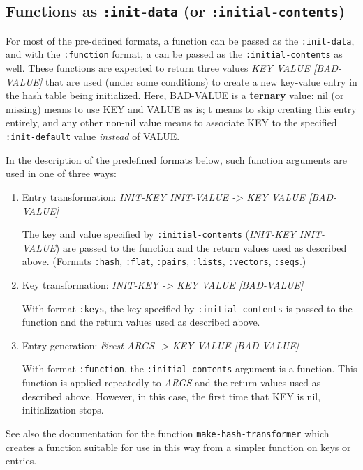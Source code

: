\documentclass[11pt]{article}
\begin{document}
\subsection{Functions as \texttt{:init-data} (or \texttt{:initial-contents})}
\label{sec-4-1}


   For most of the pre-defined formats, a function can be
   passed as the \texttt{:init-data}, and with the \texttt{:function} format,
   a can be passed as the \texttt{:initial-contents} as well.
   These functions are expected to return three values
       \emph{KEY VALUE [BAD-VALUE]}
   that are used (under some conditions) to create a new key-value
   entry in the hash table being initialized.  Here, BAD-VALUE
   is a \textbf{ternary} value: nil (or missing) means to use KEY and VALUE
   as is; t means to skip creating this entry entirely, and any
   other non-nil value means to associate KEY to the specified
   \texttt{:init-default} value \emph{instead} of VALUE.

   In the description of the predefined formats below, such function
   arguments are used in one of three ways:

\begin{enumerate}
\item Entry transformation: \emph{INIT-KEY INIT-VALUE -> KEY VALUE [BAD-VALUE]}
      
      The key and value specified by \texttt{:initial-contents} (\emph{INIT-KEY INIT-VALUE})
      are passed to the function and the return values used as described above.
      (Formats \texttt{:hash}, \texttt{:flat}, \texttt{:pairs}, \texttt{:lists}, \texttt{:vectors}, \texttt{:seqs}.)
\item Key transformation: \emph{INIT-KEY -> KEY VALUE [BAD-VALUE]}
      
      With format \texttt{:keys}, the key specified by \texttt{:initial-contents} is
      passed to the function and the return values used as described above.
\item Entry generation: \emph{&rest ARGS -> KEY VALUE [BAD-VALUE]}
      
      With format \texttt{:function}, the \texttt{:initial-contents} argument is a function.
      This function is applied repeatedly to \emph{ARGS} and the return values
      used as described above. However, in this case, the first time
      that KEY is nil, initialization stops.
\end{enumerate}

   See also the documentation for the function \texttt{make-hash-transformer}
   which creates a function suitable for use in this way from a simpler
   function on keys or entries.
\end{document}
